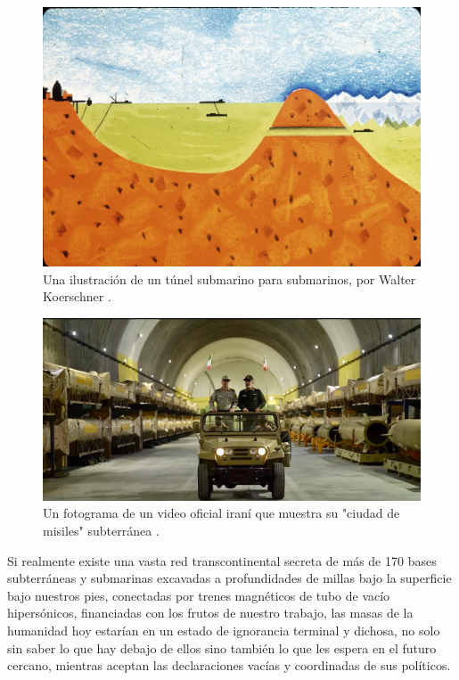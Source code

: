 \documentclass[10pt,twocolumn,letterpaper]{article}
\begin{document}
\begin{figure}[t]
\begin{center}
   \includegraphics[width=1\linewidth]{sub.jpg}
\end{center}
   \caption{Una ilustración de un túnel submarino para submarinos, por Walter Koerschner \cite{22,23}.}
\label{fig:6}
\label{fig:onecol}
\end{figure}

\begin{figure}[t]
\begin{center}
   \includegraphics[width=1\linewidth]{iran.jpeg}
\end{center}
   \caption{Un fotograma de un video oficial iraní que muestra su "ciudad de misiles" subterránea \cite{39,40}.}
\label{fig:12}
\label{fig:onecol}
\end{figure}

Si realmente existe una vasta red transcontinental secreta de más de 170 bases subterráneas y submarinas excavadas a profundidades de millas bajo la superficie bajo nuestros pies, conectadas por trenes magnéticos de tubo de vacío hipersónicos, financiadas con los frutos de nuestro trabajo, las masas de la humanidad hoy estarían en un estado de ignorancia terminal y dichosa, no solo sin saber lo que hay debajo de ellos sino también lo que les espera en el futuro cercano, mientras aceptan las declaraciones vacías y coordinadas de sus políticos.
\end{document}
